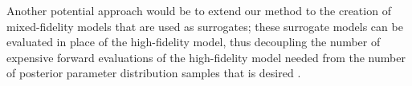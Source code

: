 \documentclass[review]{siamart0516}
\providecommand{\DIFaddend}{} %
\DeclareRobustCommand{\DIFaddend}{\DIFOaddend \let\includegraphics\DIFOincludegraphics} %
\begin{document}
\DIFaddend Another potential approach would be to extend our method to the creation of mixed-fidelity models that are used as surrogates; these surrogate models can be evaluated in place of the high-fidelity model, thus decoupling the number of expensive forward evaluations of the high-fidelity model needed from the number of posterior parameter distribution samples that is desired \cite{Con14}.

\end{document}
